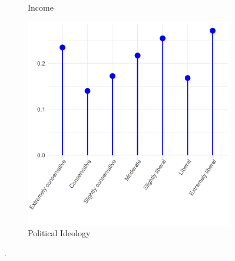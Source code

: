 \documentclass[12pt]{article}
\begin{document}
\begin{figure}[ht!]
\begin{subfigure}[b]{0.45\textwidth}
            \caption{Income}
            \label{fig:cat-tol-inc}
    \end{subfigure}
     \begin{subfigure}[b]{0.45\textwidth}
        \includegraphics[width=1.0\textwidth]{Plots/uni-dist-cat-tol-pol.png}
            \caption{Political Ideology}
            \label{fig:cat-tol-pol}
    \end{subfigure}
    \caption{.}
    \label{fig:cat-tol}
\end{figure}

\newpage


\end{document}
